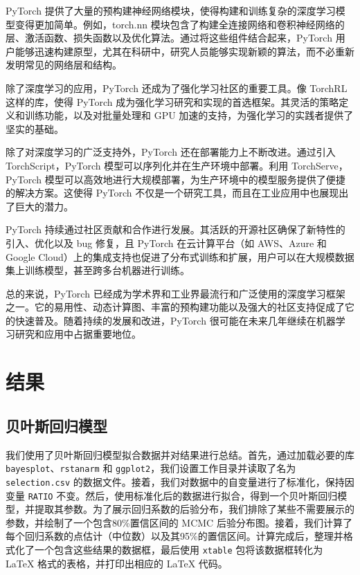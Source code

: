 \documentclass[AutoFakeBold]{LZUThesis-PgD&PhD}
\begin{document}
	PyTorch 提供了大量的预构建神经网络模块，使得构建和训练复杂的深度学习模型变得更加简单。例如，torch.nn 模块包含了构建全连接网络和卷积神经网络的层、激活函数、损失函数以及优化算法。通过将这些组件结合起来，PyTorch 用户能够迅速构建原型，尤其在科研中，研究人员能够实现新颖的算法，而不必重新发明常见的网络层和结构。
	
	除了深度学习的应用，PyTorch 还成为了强化学习社区的重要工具。像 TorchRL 这样的库，使得 PyTorch 成为强化学习研究和实现的首选框架。其灵活的策略定义和训练功能，以及对批量处理和 GPU 加速的支持，为强化学习的实践者提供了坚实的基础。
	
	除了对深度学习的广泛支持外，PyTorch 还在部署能力上不断改进。通过引入 TorchScript，PyTorch 模型可以序列化并在生产环境中部署。利用 TorchServe，PyTorch 模型可以高效地进行大规模部署，为生产环境中的模型服务提供了便捷的解决方案。这使得 PyTorch 不仅是一个研究工具，而且在工业应用中也展现出了巨大的潜力。
	
	PyTorch 持续通过社区贡献和合作进行发展。其活跃的开源社区确保了新特性的引入、优化以及 bug 修复，且 PyTorch 在云计算平台（如 AWS、Azure 和 Google Cloud）上的集成支持也促进了分布式训练和扩展，用户可以在大规模数据集上训练模型，甚至跨多台机器进行训练。
	
	总的来说，PyTorch 已经成为学术界和工业界最流行和广泛使用的深度学习框架之一。它的易用性、动态计算图、丰富的预构建功能以及强大的社区支持促成了它的快速普及。随着持续的发展和改进，PyTorch 很可能在未来几年继续在机器学习研究和应用中占据重要地位。
	
	\chapter{结果}
	
	\section{贝叶斯回归模型}
	我们使用了贝叶斯回归模型拟合数据并对结果进行总结。首先，通过加载必要的库 \texttt{bayesplot}、\texttt{rstanarm} 和 \texttt{ggplot2}，我们设置工作目录并读取了名为 \texttt{selection.csv} 的数据文件。接着，我们对数据中的自变量进行了标准化，保持因变量 \texttt{RATIO} 不变。然后，使用标准化后的数据进行拟合，得到一个贝叶斯回归模型，并提取其参数。为了展示回归系数的后验分布，我们排除了某些不需要展示的参数，并绘制了一个包含80\%置信区间的 MCMC 后验分布图。接着，我们计算了每个回归系数的点估计（中位数）以及其95\%的置信区间。计算完成后，整理并格式化了一个包含这些结果的数据框，最后使用 \texttt{xtable} 包将该数据框转化为 LaTeX 格式的表格，并打印出相应的 LaTeX 代码。
	
\end{document}
